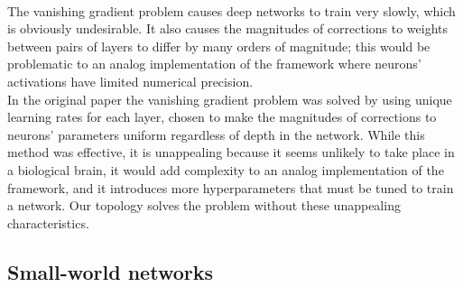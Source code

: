 \documentclass{article}
\newcommand{\npar}{\\\indent}
\begin{document}
\npar
The vanishing gradient problem causes deep networks to train very slowly, which is obviously undesirable. It also causes the magnitudes of corrections to weights between pairs of layers to differ by many orders of magnitude; this would be problematic to an analog implementation of the framework where neurons' activations have limited numerical precision.
\npar
In the original paper the vanishing gradient problem was solved by using unique learning rates for each layer, chosen to make the magnitudes of corrections to neurons' parameters uniform regardless of depth in the network. While this method was effective, it is unappealing because it seems unlikely to take place in a biological brain, it would add complexity to an analog implementation of the framework, and it introduces more hyperparameters that must be tuned to train a network. Our topology solves the problem without these unappealing characteristics.

\subsection{Small-world networks}
\label{sec:sw_background}
\end{document}
